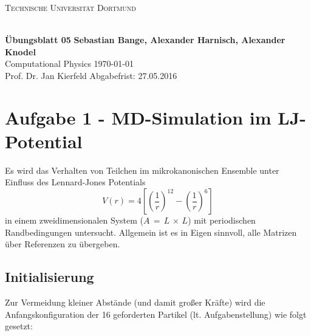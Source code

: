 
\usepackage{verbatim}
\newcommand\OverfullCenter[1]{\noindent\makebox[\linewidth]{#1}}

\noindent
\centerline{\small{\textsc{Technische Universität Dortmund}}} \\
\large\textbf{Übungsblatt 05} \hfill \footnotesize\textbf{Sebastian Bange, Alexander Harnisch, Alexander Knodel} \\
\normalsize Computational Physics \hfill \today \\
Prof. Dr. Jan Kierfeld \hfill Abgabefrist: 27.05.2016\\
\noindent\makebox[\linewidth]{\rule{\textwidth}{0.4pt}}
\section*{Aufgabe 1 - MD-Simulation im LJ-Potential}
Es wird das Verhalten von Teilchen im mikrokanonischen Ensemble unter Einfluss des Lennard-Jones Potentials
\begin{equation}
V(r) = 4 \left[\left(\frac{1}{r}\right)^{12}-\left(\frac{1}{r}\right)^6\right]
\label{eq:lJ}
\end{equation}
in einem zweidimensionalen System ($A\,=\,L\,\times\,L$) mit periodischen Randbedingungen untersucht. Allgemein ist es in Eigen sinnvoll, alle Matrizen über Referenzen zu übergeben.

\subsection*{Initialisierung}
Zur Vermeidung kleiner Abstände (und damit großer Kräfte) wird die Anfangskonfiguration der 16 geforderten Partikel (lt. Aufgabenstellung) wie folgt gesetzt:

